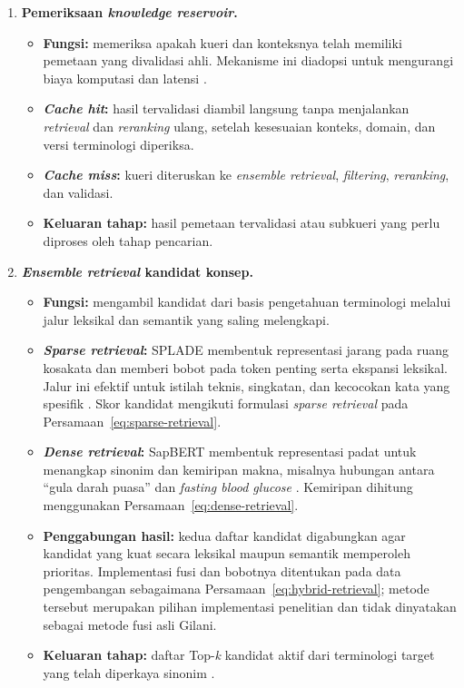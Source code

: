 \begin{enumerate}
    \item \textbf{Pemeriksaan \textit{knowledge reservoir}.}
    \begin{itemize}
        \item \textbf{Fungsi:} memeriksa apakah kueri dan konteksnya telah memiliki pemetaan yang divalidasi ahli. Mekanisme ini diadopsi untuk mengurangi biaya komputasi dan latensi \citep{gilani_cde-mapper_2025}.
        \item \textbf{\textit{Cache hit}:} hasil tervalidasi diambil langsung tanpa menjalankan \textit{retrieval} dan \textit{reranking} ulang, setelah kesesuaian konteks, domain, dan versi terminologi diperiksa.
        \item \textbf{\textit{Cache miss}:} kueri diteruskan ke \textit{ensemble retrieval}, \textit{filtering}, \textit{reranking}, dan validasi.
        \item \textbf{Keluaran tahap:} hasil pemetaan tervalidasi atau subkueri yang perlu diproses oleh tahap pencarian.
    \end{itemize}

    \item \textbf{\textit{Ensemble retrieval} kandidat konsep.}
    \begin{itemize}
        \item \textbf{Fungsi:} mengambil kandidat dari basis pengetahuan terminologi melalui jalur leksikal dan semantik yang saling melengkapi.
        \item \textbf{\textit{Sparse retrieval}:} SPLADE membentuk representasi jarang pada ruang kosakata dan memberi bobot pada token penting serta ekspansi leksikal. Jalur ini efektif untuk istilah teknis, singkatan, dan kecocokan kata yang spesifik \citep{formal_splade_2021}. Skor kandidat mengikuti formulasi \textit{sparse retrieval} pada Persamaan~\ref{eq:sparse-retrieval}.
        \item \textbf{\textit{Dense retrieval}:} SapBERT membentuk representasi padat untuk menangkap sinonim dan kemiripan makna, misalnya hubungan antara ``gula darah puasa'' dan \textit{fasting blood glucose} \citep{liu_self-alignment_2021}. Kemiripan dihitung menggunakan Persamaan~\ref{eq:dense-retrieval}.
        \item \textbf{Penggabungan hasil:} kedua daftar kandidat digabungkan agar kandidat yang kuat secara leksikal maupun semantik memperoleh prioritas. Implementasi fusi dan bobotnya ditentukan pada data pengembangan sebagaimana Persamaan~\ref{eq:hybrid-retrieval}; metode tersebut merupakan pilihan implementasi penelitian dan tidak dinyatakan sebagai metode fusi asli Gilani.
        \item \textbf{Keluaran tahap:} daftar Top-\textit{k} kandidat aktif dari terminologi target yang telah diperkaya sinonim \citep{gilani_cde-mapper_2025}.
    \end{itemize}


\end{enumerate}
